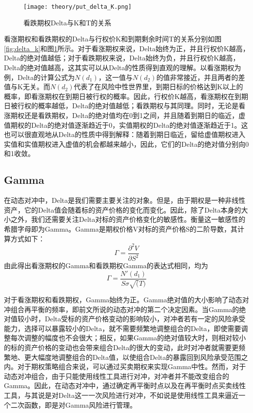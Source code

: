 \begin{figure}[htb]
  \centering
  \texttt{[image: theory/put\_delta\_K.png]}
  \caption[这里将出现在插图索引中]
    {看跌期权Delta与K和T的关系}
  \label{fig:put_delta_k}
\end{figure}

看涨期权和看跌期权的Delta与行权价K和到期剩余时间T的关系分别如图\ref{fig:delta_k}和图\ref{fig:put_delta_k}所示。对于看涨期权来说，Delta始终为正，并且行权价K越高，Delta的绝对值越低；对于看跌期权来说，Delta始终为负，并且行权价K越高，Delta的绝对值越高，这其实可以从Delta的性质得到直观的理解。以看涨期权为例，Delta的计算公式为$N(d_1)$，这一值与$N(d_2)$的值非常接近，并且两者的差值与K无关。而$N(d_2)$代表了在风险中性世界里，到期日标的价格达到K以上的概率，即看涨期权在到期日被行权的概率。因此，行权价K越高，看涨期权在到期日被行权的概率越低，Delta的绝对值越低；看跌期权与其同理。同时，无论是看涨期权还是看跌期权，Delta的绝对值均在0到1之间，并且随着到期日的临近，虚值期权的Delta的绝对值逐渐趋近于0，实值期权的Delta的绝对值逐渐趋近于1。这也可以很直观地从Delta的性质中得到解释：随着到期日临近，留给虚值期权进入实值和实值期权进入虚值的机会都越来越小，因此，它们的Delta的绝对值分别向0和1收敛。

\subsection{Gamma}

在动态对冲中，Delta是我们需要主要关注的对象。但是，由于期权是一种非线性资产，它的Delta值会随着标的资产价格的变化而变化。因此，除了Delta本身的大小之外，我们还需要关注Delta对标的资产价格变化的敏感性。衡量这一敏感性的希腊字母即为Gamma。Gamma是期权价格V对标的资产价格S的二阶导数，其计算方式如下：
\begin{equation}
  \Gamma=\frac{\partial^2 V}{\partial S^2}
\end{equation}
由此得出看涨期权的Gamma和看跌期权Gamma的表达式相同，均为
\begin{equation}
  \Gamma=\frac{N'(d_1)}{S\sigma\sqrt(T)}
\end{equation}

对于看涨期权和看跌期权，Gamma始终为正。Gamma绝对值的大小影响了动态对冲组合再平衡的频率，即前文所说的动态对冲的第二个决定因素。当Gamma的绝对值较小时，Delta受标的资产价格变动的影响较小，对冲者若有一定的风险承受能力，选择可以暴露较小的Delta，就不需要频繁地调整组合的Delta，即使需要调整每次调整的幅度也不会很大；相反，如果Gamma的绝对值较大时，则相对较小的标的资产价格的变动也会带来组合Delta的很大的变动，此时对冲者就需要更频繁地、更大幅度地调整组合的Delta值，以使组合Delta的暴露回到风险承受范围之内。对于期权策略组合来说，可以通过买卖期权来实现Gamma中性。然而，对于动态对冲组合，由于只能使用线性工具进行对冲，对冲者并不能改变组合的Gamma。因此，在动态对冲中，通过确定再平衡时点以及在再平衡时点买卖线性工具，与其说是对Delta这一一次风险进行对冲，不如说是使用线性工具来逼近一个二次函数，即是对Gamma风险进行管理。

